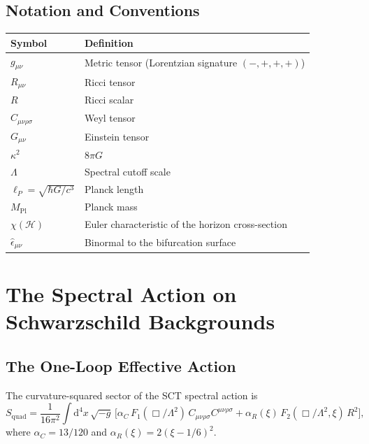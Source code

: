 \documentclass[11pt,a4paper]{article}
\newcommand{\Rsq}{R^2}
\newcommand{\Weylsq}{C_{\mu\nu\rho\sigma}C^{\mu\nu\rho\sigma}}
\renewcommand{\dd}{\mathrm{d}}
\theoremstyle{plain}
\theoremstyle{definition}
\begin{document}
\subsection{Notation and Conventions}

\begin{center}
\begin{tabular}{ll}
\toprule
Symbol & Definition \\
\midrule
$g_{\mu\nu}$ & Metric tensor (Lorentzian signature $(-,+,+,+)$) \\
$R_{\mu\nu}$ & Ricci tensor \\
$R$ & Ricci scalar \\
$C_{\mu\nu\rho\sigma}$ & Weyl tensor \\
$G_{\mu\nu}$ & Einstein tensor \\
$\kappa^2$ & $8\pi G$ \\
$\Lambda$ & Spectral cutoff scale \\
$\ell_P = \sqrt{\hbar G/c^3}$ & Planck length \\
$M_{\mathrm{Pl}}$ & Planck mass \\
$\chi(\mathcal{H})$ & Euler characteristic of the horizon cross-section \\
$\hat{\epsilon}_{\mu\nu}$ & Binormal to the bifurcation surface \\
\bottomrule
\end{tabular}
\end{center}

\section{The Spectral Action on Schwarzschild Backgrounds}
\label{sec:spectral-action}

\subsection{The One-Loop Effective Action}

The curvature-squared sector of the SCT spectral action is
\begin{equation}\label{eq:S-quad}
  S_{\mathrm{quad}} = \frac{1}{16\pi^2}\int\dd^4 x\,\sqrt{-g}\,
  \bigl[\alpha_C\, F_1(\Box/\Lambda^2)\,\Weylsq
  + \alpha_R(\xi)\, F_2(\Box/\Lambda^2,\xi)\,\Rsq\bigr],
\end{equation}
where $\alpha_C = 13/120$ and $\alpha_R(\xi) = 2(\xi - 1/6)^2$.
\end{document}
